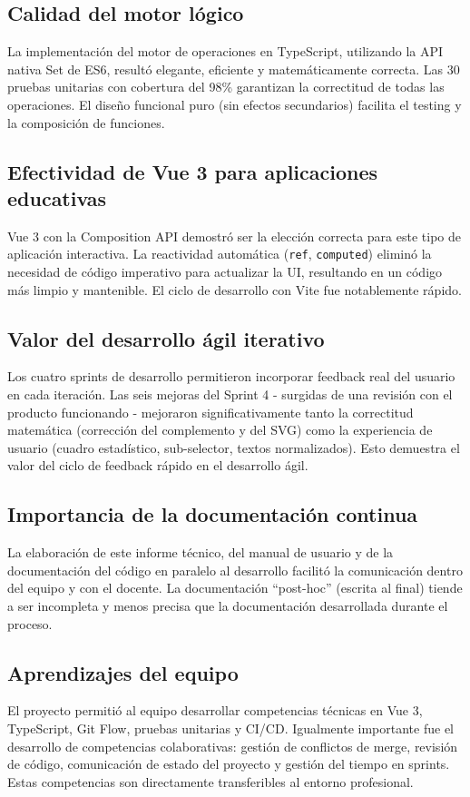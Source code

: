\documentclass[11pt,a4paper]{article}
\begin{document}
\subsection{Calidad del motor lógico}
La implementación del motor de operaciones en TypeScript, utilizando la API nativa Set de ES6, resultó elegante, eficiente y matemáticamente correcta. Las 30 pruebas unitarias con cobertura del 98\% garantizan la correctitud de todas las operaciones. El diseño funcional puro (sin efectos secundarios) facilita el testing y la composición de funciones.

\subsection{Efectividad de Vue 3 para aplicaciones educativas}
Vue 3 con la Composition API demostró ser la elección correcta para este tipo de aplicación interactiva. La reactividad automática (\texttt{ref}, \texttt{computed}) eliminó la necesidad de código imperativo para actualizar la UI, resultando en un código más limpio y mantenible. El ciclo de desarrollo con Vite fue notablemente rápido.

\subsection{Valor del desarrollo ágil iterativo}
Los cuatro sprints de desarrollo permitieron incorporar feedback real del usuario en cada iteración. Las seis mejoras del Sprint 4 - surgidas de una revisión con el producto funcionando - mejoraron significativamente tanto la correctitud matemática (corrección del complemento y del SVG) como la experiencia de usuario (cuadro estadístico, sub-selector, textos normalizados). Esto demuestra el valor del ciclo de feedback rápido en el desarrollo ágil.

\subsection{Importancia de la documentación continua}
La elaboración de este informe técnico, del manual de usuario y de la documentación del código en paralelo al desarrollo facilitó la comunicación dentro del equipo y con el docente. La documentación ``post-hoc'' (escrita al final) tiende a ser incompleta y menos precisa que la documentación desarrollada durante el proceso.

\subsection{Aprendizajes del equipo}
El proyecto permitió al equipo desarrollar competencias técnicas en Vue 3, TypeScript, Git Flow, pruebas unitarias y CI/CD. Igualmente importante fue el desarrollo de competencias colaborativas: gestión de conflictos de merge, revisión de código, comunicación de estado del proyecto y gestión del tiempo en sprints. Estas competencias son directamente transferibles al entorno profesional.
\end{document}
